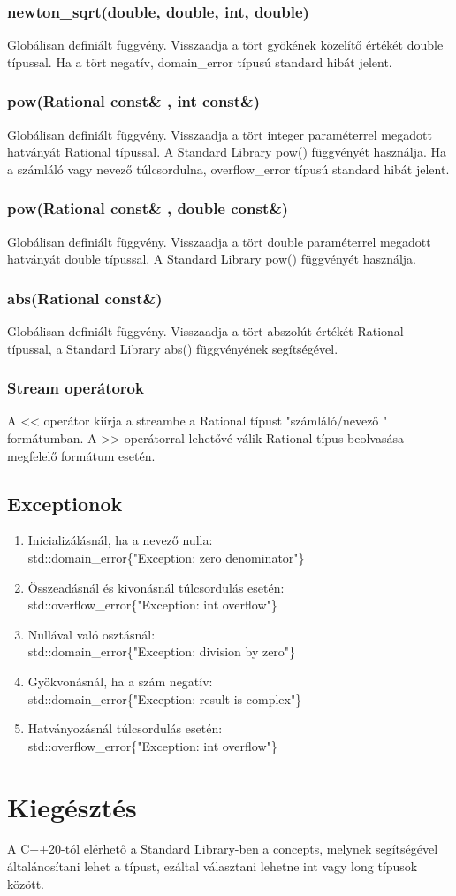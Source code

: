 \documentclass[a4paper, 12pt]{article}
\begin{document}
\subsubsection*{newton\_sqrt(double, double, int, double)}
Globálisan definiált függvény. Visszaadja a tört gyökének közelítő értékét double típussal. Ha a tört negatív, domain\_error típusú standard hibát jelent.

\subsubsection*{pow(Rational const\& , int const\&)}
Globálisan definiált függvény. Visszaadja a tört integer paraméterrel megadott hatványát Rational típussal. A Standard Library pow() függvényét használja. Ha a számláló vagy nevező túlcsordulna, overflow\_error típusú standard hibát jelent.

\subsubsection*{pow(Rational const\& , double const\&)}
Globálisan definiált függvény. Visszaadja a tört double paraméterrel megadott hatványát double típussal. A Standard Library pow() függvényét használja.

\subsubsection*{abs(Rational const\&)}
Globálisan definiált függvény. Visszaadja a tört abszolút értékét Rational típussal, a Standard Library abs() függvényének segítségével.

\subsubsection*{Stream operátorok}
A << operátor kiírja a streambe a Rational típust "számláló/nevező " formátumban. A >> operátorral lehetővé válik Rational típus beolvasása megfelelő formátum esetén.

\subsection*{Exceptionok}
\begin{enumerate}
  \item Inicializálásnál, ha a nevező nulla: \\std::domain\_error\{"Exception: zero denominator"\}
  \item Összeadásnál és kivonásnál túlcsordulás esetén:\\ std::overflow\_error\{"Exception: int overflow"\}
  \item Nullával való osztásnál: \\std::domain\_error\{"Exception: division by zero"\}
  \item Gyökvonásnál, ha a szám negatív: \\std::domain\_error\{"Exception: result is complex"\}
  \item Hatványozásnál túlcsordulás esetén: \\std::overflow\_error\{"Exception: int overflow"\}
\end{enumerate}


\section{Kiegésztés}
A C++20-tól elérhető a Standard Library-ben a concepts, melynek segítségével általánosítani lehet a típust, ezáltal választani lehetne int vagy long típusok között.
\end{document}
